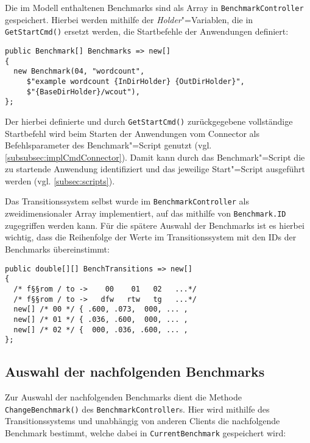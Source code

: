 Die im Modell enthaltenen Benchmarks sind als Array in \texttt{BenchmarkController} gespeichert.
Hierbei werden mithilfe der \emph{Holder}"=Variablen, die in \texttt{GetStartCmd()} ersetzt werden, die Startbefehle der Anwendungen definiert:

\begin{lstlisting}[label=lst:benchmarkDefinition,style=cs,
caption={[Definition der verfügbaren Benchmarks im BenchmarkController]
    Definition der verfügbaren Benchmarks im \texttt{BenchmarkController} (gekürzt)}]
public Benchmark[] Benchmarks => new[]
{
  new Benchmark(04, "wordcount",
     $"example wordcount {InDirHolder} {OutDirHolder}",
     $"{BaseDirHolder}/wcout"),
};
\end{lstlisting}

Der hierbei definierte und durch \texttt{GetStartCmd()} zurückgegebene vollständige Startbefehl wird beim Starten der Anwendungen vom Connector als Befehlsparameter des Benchmark"=Script genutzt (vgl. \cref{subsubsec:implCmdConnector}).
Damit kann durch das Benchmark"=Script die zu startende Anwendung identifiziert und das jeweilige Start"=Script ausgeführt werden (vgl. \cref{subsec:scripts}).

Das Transitionssystem selbst wurde im \texttt{BenchmarkController} als zweidimensionaler Array implementiert, auf das mithilfe von \texttt{Benchmark.ID} zugegriffen werden kann.
Für die spätere Auswahl der Benchmarks ist es hierbei wichtig, dass die Reihenfolge der Werte im Transitionssystem mit den IDs der Benchmarks übereinstimmt:

\begin{lstlisting}[label=lst:transitionSystemImpl,style=cs,
caption={[Implementierung des Transitionssystems im BenchmarkController]
    Implementierung des Transitionssystems im \texttt{BenchmarkController} (gekürzt)}]
public double[][] BenchTransitions => new[]
{
  /* f§§rom / to ->    00    01   02   ...*/
  /* f§§rom / to ->   dfw   rtw   tg   ...*/
  new[] /* 00 */ { .600, .073,  000, ... ,
  new[] /* 01 */ { .036, .600,  000, ... ,
  new[] /* 02 */ {  000, .036, .600, ... ,
};
\end{lstlisting}

\subsection{Auswahl der nachfolgenden Benchmarks}
\label{subsec:selectionNextBenchmark}

Zur Auswahl der nachfolgenden Benchmarks dient die Methode \texttt{ChangeBenchmark()} des \texttt{BenchmarkController}s.
Hier wird mithilfe des Transitionssystems und unabhängig von anderen Clients die nachfolgende Benchmark bestimmt, welche dabei in \texttt{CurrentBenchmark} gespeichert wird:

